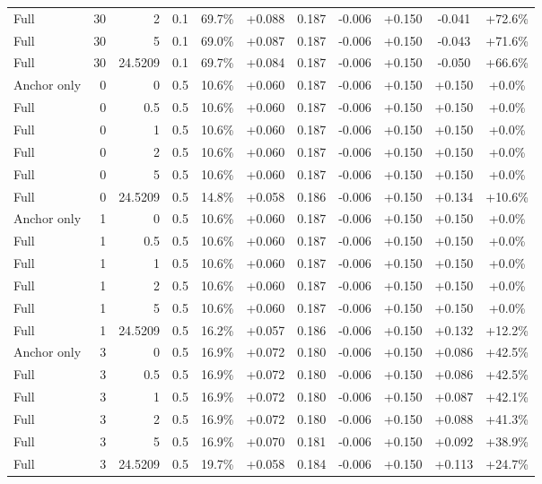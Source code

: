 \begin{table}[htbp]
\begin{tabular}{lrrrccccccc}
Full & 30 & 2 & 0.1 & 69.7\% & +0.088 & 0.187 & -0.006 & +0.150 & -0.041 & +72.6\% \\
Full & 30 & 5 & 0.1 & 69.0\% & +0.087 & 0.187 & -0.006 & +0.150 & -0.043 & +71.6\% \\
Full & 30 & 24.5209 & 0.1 & 69.7\% & +0.084 & 0.187 & -0.006 & +0.150 & -0.050 & +66.6\% \\
Anchor only & 0 & 0 & 0.5 & 10.6\% & +0.060 & 0.187 & -0.006 & +0.150 & +0.150 & +0.0\% \\
Full & 0 & 0.5 & 0.5 & 10.6\% & +0.060 & 0.187 & -0.006 & +0.150 & +0.150 & +0.0\% \\
Full & 0 & 1 & 0.5 & 10.6\% & +0.060 & 0.187 & -0.006 & +0.150 & +0.150 & +0.0\% \\
Full & 0 & 2 & 0.5 & 10.6\% & +0.060 & 0.187 & -0.006 & +0.150 & +0.150 & +0.0\% \\
Full & 0 & 5 & 0.5 & 10.6\% & +0.060 & 0.187 & -0.006 & +0.150 & +0.150 & +0.0\% \\
Full & 0 & 24.5209 & 0.5 & 14.8\% & +0.058 & 0.186 & -0.006 & +0.150 & +0.134 & +10.6\% \\
Anchor only & 1 & 0 & 0.5 & 10.6\% & +0.060 & 0.187 & -0.006 & +0.150 & +0.150 & +0.0\% \\
Full & 1 & 0.5 & 0.5 & 10.6\% & +0.060 & 0.187 & -0.006 & +0.150 & +0.150 & +0.0\% \\
Full & 1 & 1 & 0.5 & 10.6\% & +0.060 & 0.187 & -0.006 & +0.150 & +0.150 & +0.0\% \\
Full & 1 & 2 & 0.5 & 10.6\% & +0.060 & 0.187 & -0.006 & +0.150 & +0.150 & +0.0\% \\
Full & 1 & 5 & 0.5 & 10.6\% & +0.060 & 0.187 & -0.006 & +0.150 & +0.150 & +0.0\% \\
Full & 1 & 24.5209 & 0.5 & 16.2\% & +0.057 & 0.186 & -0.006 & +0.150 & +0.132 & +12.2\% \\
Anchor only & 3 & 0 & 0.5 & 16.9\% & +0.072 & 0.180 & -0.006 & +0.150 & +0.086 & +42.5\% \\
Full & 3 & 0.5 & 0.5 & 16.9\% & +0.072 & 0.180 & -0.006 & +0.150 & +0.086 & +42.5\% \\
Full & 3 & 1 & 0.5 & 16.9\% & +0.072 & 0.180 & -0.006 & +0.150 & +0.087 & +42.1\% \\
Full & 3 & 2 & 0.5 & 16.9\% & +0.072 & 0.180 & -0.006 & +0.150 & +0.088 & +41.3\% \\
Full & 3 & 5 & 0.5 & 16.9\% & +0.070 & 0.181 & -0.006 & +0.150 & +0.092 & +38.9\% \\
Full & 3 & 24.5209 & 0.5 & 19.7\% & +0.058 & 0.184 & -0.006 & +0.150 & +0.113 & +24.7\% \\

\end{tabular}
\end{table}
